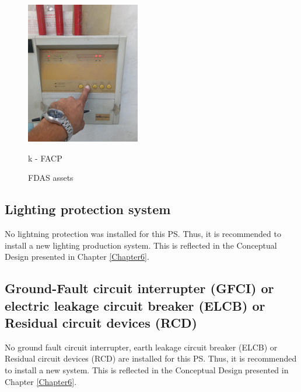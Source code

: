 \begin{figure}[h]
\begin{minipage}[b]{0.22\linewidth}
	\includegraphics[width=\textwidth]{figures/ch05_fdas_facp}
	\caption*{k - FACP}
\end{minipage}
	\caption{FDAS assets}
	\label{ch05_fig_fdas01}
\end{figure}



\subsection{Lighting protection system} \label{fdas02}
No lightning protection was installed for this PS. Thus, it is recommended to install a new lighting production system. This is reflected in the Conceptual Design presented in Chapter \ref{Chapter6}.
\subsection{Ground-Fault circuit interrupter (GFCI) or electric leakage circuit breaker (ELCB) or Residual circuit devices (RCD)} \label{fdas03}
No ground fault circuit interrupter, earth leakage circuit breaker (ELCB) or Residual circuit devices (RCD) are installed for this PS. Thus, it is recommended to install a new system. This is reflected in the Conceptual Design presented in Chapter \ref{Chapter6}.
